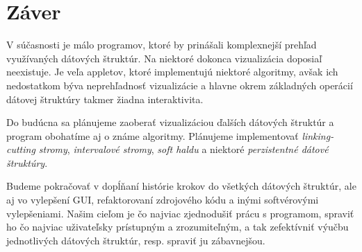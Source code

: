 \section{Záver}

V súčasnosti je málo programov, ktoré by prinášali komplexnejší prehľad 
využívaných dátových štruktúr. Na niektoré dokonca vizualizácia doposiaľ 
neexistuje. Je veľa appletov, ktoré implementujú niektoré algoritmy, avšak 
ich nedostatkom býva neprehľadnosť vizualizácie a hlavne okrem základných 
operácií dátovej štruktúry takmer žiadna interaktivita. 

Do budúcna sa plánujeme zaoberať vizualizáciou ďalších dátových 
štruktúr a program obohatíme aj o známe algoritmy. Plánujeme implementovať 
\emph{linking-cutting stromy}, \emph{intervalové stromy}, \emph{soft haldu} 
a niektoré \emph{perzistentné dátové štruktúry}.

Budeme pokračovať v 
dopĺňaní histórie krokov do všetkých dátových štruktúr, ale aj vo vylepšení 
GUI, refaktorovaní zdrojového kódu a inými softvérovými vylepšeniami. Našim 
cieľom je čo najviac zjednodušiť prácu s programom, spraviť ho čo najviac 
uživateľsky prístupným a zrozumiteľným, a tak zefektívniť výučbu 
jednotlivých dátových štruktúr, resp. spraviť ju zábavnejšou.
